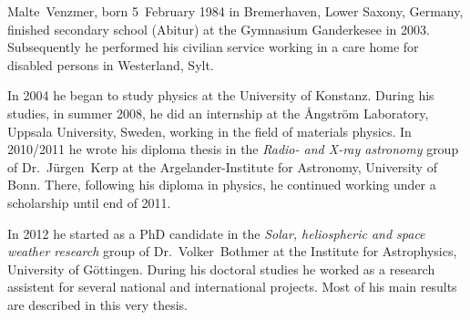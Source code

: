

Malte~Venzmer, born 5~February 1984 in Bremerhaven, Lower Saxony, Germany, finished secondary school (Abitur) at the Gymnasium Ganderkesee in 2003. Subsequently he performed his civilian service working in a care home for disabled persons in Westerland, Sylt.

In 2004 he began to study physics at the University of Konstanz. During his studies, in summer 2008, he did an internship at the \AA{}ngström Laboratory, Uppsala University, Sweden, working in the field of materials physics. In 2010/2011 he wrote his diploma thesis in the \textit{Radio- and X-ray astronomy} group of Dr.~Jürgen~Kerp at the Argelander-Institute for Astronomy, University of Bonn. There, following his diploma in physics, he continued working under a scholarship until end of 2011.

In 2012 he started as a PhD candidate in the \textit{Solar, heliospheric and space weather research} group of Dr.~Volker~Bothmer at the Institute for Astrophysics, University of Göttingen. During his doctoral studies he worked as a research assistent for several national and international projects. Most of his main results are described in this very thesis.

